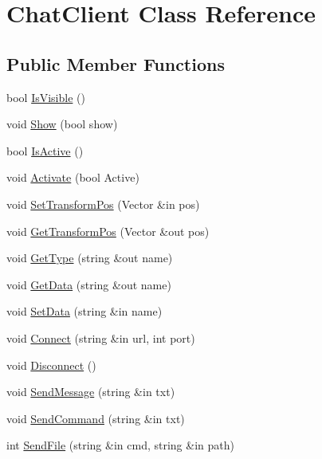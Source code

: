 \hypertarget{class_chat_client}{}\section{Chat\+Client Class Reference}
\label{class_chat_client}
\subsection*{Public Member Functions}
\begin{DoxyCompactItemize}
\item 
bool \hyperlink{class_chat_client_a93eba5557dbdc524c5f2d4c0f3490d38}{Is\+Visible} ()
\item 
void \hyperlink{class_chat_client_abd289f27ec7aee5a84b4c7be11df3e50}{Show} (bool show)
\item 
bool \hyperlink{class_chat_client_acbf1b2170af3d95ea82e23c4b3a41be4}{Is\+Active} ()
\item 
void \hyperlink{class_chat_client_ac6a54ab6e35f4e35df689ce39b161e00}{Activate} (bool Active)
\item 
void \hyperlink{class_chat_client_a1553a17079f2fec4bf4d61b50ee0db1e}{Set\+Transform\+Pos} (Vector \&in pos)
\item 
void \hyperlink{class_chat_client_a5021d6a5e0916e82bfa79a3a15df72dd}{Get\+Transform\+Pos} (Vector \&out pos)
\item 
void \hyperlink{class_chat_client_a190e2eb69502d589245d71edb4e74742}{Get\+Type} (string \&out name)
\item 
void \hyperlink{class_chat_client_aebf7f14cb30dc6295614e8b43f534874}{Get\+Data} (string \&out name)
\item 
void \hyperlink{class_chat_client_a4d1b907866e4f1f994077a5eb1a5f4eb}{Set\+Data} (string \&in name)
\item 
void \hyperlink{class_chat_client_a44af52986be20c2060f7a1152d470ce2}{Connect} (string \&in url, int port)
\item 
void \hyperlink{class_chat_client_a94275ac2799d57adf196deb905c5546d}{Disconnect} ()
\item 
void \hyperlink{class_chat_client_aeebdad7cf66c7243580af41df5d4ddf6}{Send\+Message} (string \&in txt)
\item 
void \hyperlink{class_chat_client_a13f4f30bf03e04599227af3e85e67b81}{Send\+Command} (string \&in txt)
\item 
int \hyperlink{class_chat_client_ab73b9fce02fa5d55b7db085290e0e694}{Send\+File} (string \&in cmd, string \&in path)
\end{DoxyCompactItemize}



